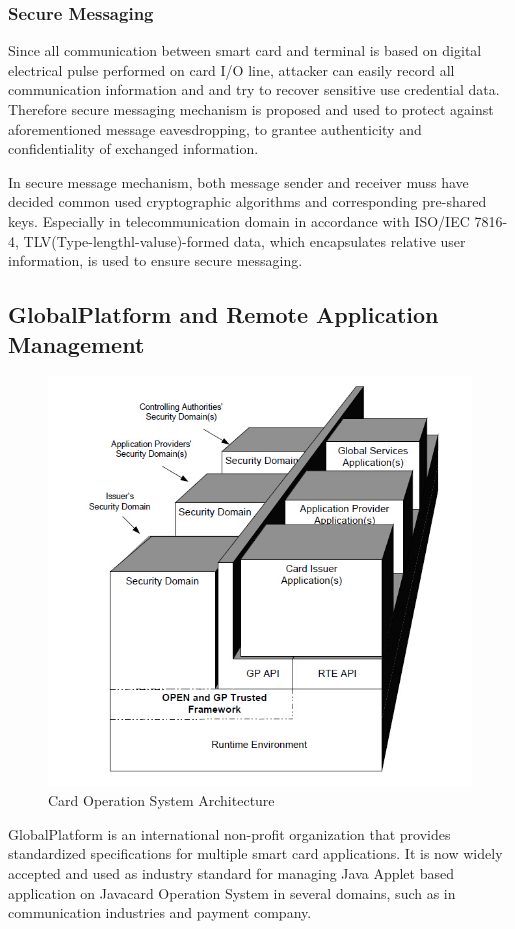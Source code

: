 \documentclass[]{llncs}
\begin{document}
\subsubsection{Secure Messaging}
Since all communication between smart card and terminal is based on digital electrical pulse performed on card I/O line, attacker can easily record all communication information and and try to recover sensitive use credential data. Therefore secure messaging mechanism is proposed and used to protect against aforementioned message eavesdropping, to grantee authenticity and confidentiality of exchanged information.

In secure message mechanism, both message sender and receiver muss have decided common used cryptographic algorithms and corresponding pre-shared keys. Especially in telecommunication domain in accordance with ISO/IEC 7816-4\cite{handbuch}, TLV(Type-lengthl-valuse)-formed data, which encapsulates relative user information, is used to ensure secure messaging.

\subsection{GlobalPlatform and Remote Application Management}

\begin{figure}[!htbp]
	\centering
	\includegraphics[width=1.2\textwidth]{gp_1.jpg}
		\caption[ ]{Card Operation System Architecture\cite{gp}}
	\label{fig:gp_1}
\end{figure}
GlobalPlatform is an international non-profit organization that provides standardized specifications for multiple smart card applications. It is now widely accepted and used as industry standard for managing Java Applet based application on Javacard Operation System in several domains, such  as in communication industries and payment company\cite{gp}. 
\end{document}
